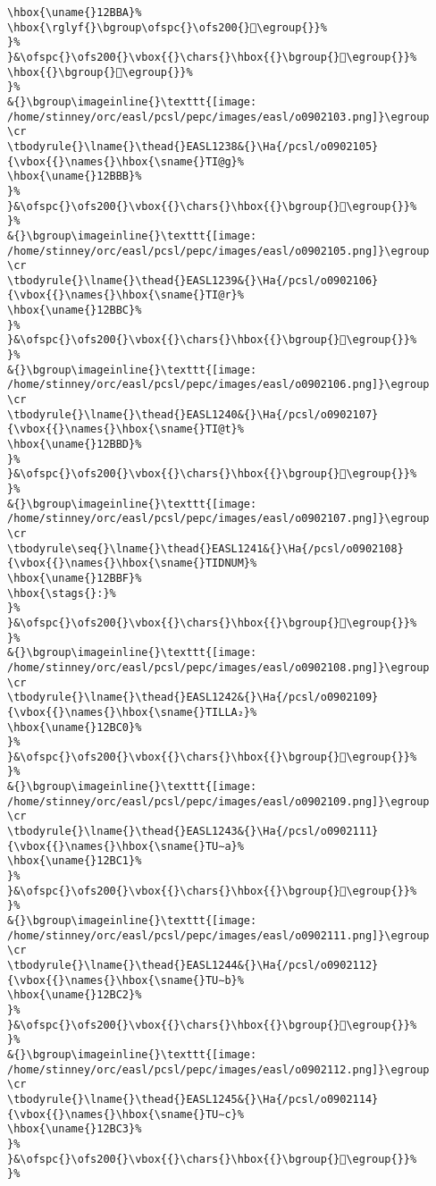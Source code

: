 \begin{verbatim}
\hbox{\uname{}12BBA}%
\hbox{\rglyf{}\bgroup\ofspc{}\ofs200{}𒮺\egroup{}}%
}%
}&\ofspc{}\ofs200{}\vbox{{}\chars{}\hbox{{}\bgroup{}𒮺\egroup{}}%
\hbox{{}\bgroup{}𒮾\egroup{}}%
}%
&{}\bgroup\imageinline{}\texttt{[image: /home/stinney/orc/easl/pcsl/pepc/images/easl/o0902103.png]}\egroup
\cr
\tbodyrule{}\lname{}\thead{}EASL1238&{}\Ha{/pcsl/o0902105}{\vbox{{}\names{}\hbox{\sname{}TI@g}%
\hbox{\uname{}12BBB}%
}%
}&\ofspc{}\ofs200{}\vbox{{}\chars{}\hbox{{}\bgroup{}𒮻\egroup{}}%
}%
&{}\bgroup\imageinline{}\texttt{[image: /home/stinney/orc/easl/pcsl/pepc/images/easl/o0902105.png]}\egroup
\cr
\tbodyrule{}\lname{}\thead{}EASL1239&{}\Ha{/pcsl/o0902106}{\vbox{{}\names{}\hbox{\sname{}TI@r}%
\hbox{\uname{}12BBC}%
}%
}&\ofspc{}\ofs200{}\vbox{{}\chars{}\hbox{{}\bgroup{}𒮼\egroup{}}%
}%
&{}\bgroup\imageinline{}\texttt{[image: /home/stinney/orc/easl/pcsl/pepc/images/easl/o0902106.png]}\egroup
\cr
\tbodyrule{}\lname{}\thead{}EASL1240&{}\Ha{/pcsl/o0902107}{\vbox{{}\names{}\hbox{\sname{}TI@t}%
\hbox{\uname{}12BBD}%
}%
}&\ofspc{}\ofs200{}\vbox{{}\chars{}\hbox{{}\bgroup{}𒮽\egroup{}}%
}%
&{}\bgroup\imageinline{}\texttt{[image: /home/stinney/orc/easl/pcsl/pepc/images/easl/o0902107.png]}\egroup
\cr
\tbodyrule\seq{}\lname{}\thead{}EASL1241&{}\Ha{/pcsl/o0902108}{\vbox{{}\names{}\hbox{\sname{}TIDNUM}%
\hbox{\uname{}12BBF}%
\hbox{\stags{}:}%
}%
}&\ofspc{}\ofs200{}\vbox{{}\chars{}\hbox{{}\bgroup{}𒮿\egroup{}}%
}%
&{}\bgroup\imageinline{}\texttt{[image: /home/stinney/orc/easl/pcsl/pepc/images/easl/o0902108.png]}\egroup
\cr
\tbodyrule{}\lname{}\thead{}EASL1242&{}\Ha{/pcsl/o0902109}{\vbox{{}\names{}\hbox{\sname{}TILLA₂}%
\hbox{\uname{}12BC0}%
}%
}&\ofspc{}\ofs200{}\vbox{{}\chars{}\hbox{{}\bgroup{}𒯀\egroup{}}%
}%
&{}\bgroup\imageinline{}\texttt{[image: /home/stinney/orc/easl/pcsl/pepc/images/easl/o0902109.png]}\egroup
\cr
\tbodyrule{}\lname{}\thead{}EASL1243&{}\Ha{/pcsl/o0902111}{\vbox{{}\names{}\hbox{\sname{}TU∼a}%
\hbox{\uname{}12BC1}%
}%
}&\ofspc{}\ofs200{}\vbox{{}\chars{}\hbox{{}\bgroup{}𒯁\egroup{}}%
}%
&{}\bgroup\imageinline{}\texttt{[image: /home/stinney/orc/easl/pcsl/pepc/images/easl/o0902111.png]}\egroup
\cr
\tbodyrule{}\lname{}\thead{}EASL1244&{}\Ha{/pcsl/o0902112}{\vbox{{}\names{}\hbox{\sname{}TU∼b}%
\hbox{\uname{}12BC2}%
}%
}&\ofspc{}\ofs200{}\vbox{{}\chars{}\hbox{{}\bgroup{}𒯂\egroup{}}%
}%
&{}\bgroup\imageinline{}\texttt{[image: /home/stinney/orc/easl/pcsl/pepc/images/easl/o0902112.png]}\egroup
\cr
\tbodyrule{}\lname{}\thead{}EASL1245&{}\Ha{/pcsl/o0902114}{\vbox{{}\names{}\hbox{\sname{}TU∼c}%
\hbox{\uname{}12BC3}%
}%
}&\ofspc{}\ofs200{}\vbox{{}\chars{}\hbox{{}\bgroup{}𒯃\egroup{}}%
}%

\end{verbatim}
